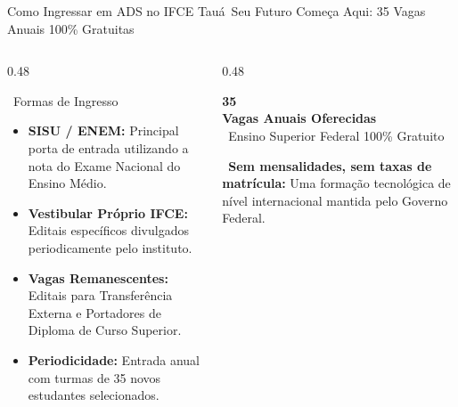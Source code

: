 
\begin{frame}{Como Ingressar em ADS no IFCE Tauá}{\faDoorOpen\ Seu Futuro Começa Aqui: 35 Vagas Anuais 100\% Gratuitas}
  \begin{columns}[t]
    \begin{column}{0.48\textwidth}
      \begin{greencard}{\faGraduationCap\ Formas de Ingresso}
        \begin{itemize}\setlength{\itemsep}{0.35em}\footnotesize
          \item \textbf{SISU / ENEM:} Principal porta de entrada utilizando a nota do Exame Nacional do Ensino Médio.
          \item \textbf{Vestibular Próprio IFCE:} Editais específicos divulgados periodicamente pelo instituto.
          \item \textbf{Vagas Remanescentes:} Editais para Transferência Externa e Portadores de Diploma de Curso Superior.
          \item \textbf{Periodicidade:} Entrada anual com turmas de 35 novos estudantes selecionados.
        \end{itemize}
      \end{greencard}
    \end{column}
    
    \begin{column}{0.48\textwidth}
      \begin{statcard}
        \Huge \textcolor{IFCEDarkGreen}{\textbf{35}} \\
        \small \textbf{Vagas Anuais Oferecidas} \\
        \scriptsize \textcolor{IFCERed}{\faCheckCircle\ Ensino Superior Federal 100\% Gratuito}
      \end{statcard}
      \vspace{0.2cm}
      \begin{tcolorbox}[enhanced, colback=IFCEGreen!8, colframe=IFCEGreen, arc=2mm, boxrule=0.8pt, left=2.5mm, right=2.5mm, top=2mm, bottom=2mm]
        \scriptsize \faStar\ \textbf{Sem mensalidades, sem taxas de matrícula:} Uma formação tecnológica de nível internacional mantida pelo Governo Federal.
      \end{tcolorbox}
    \end{column}
  \end{columns}
\end{frame}

